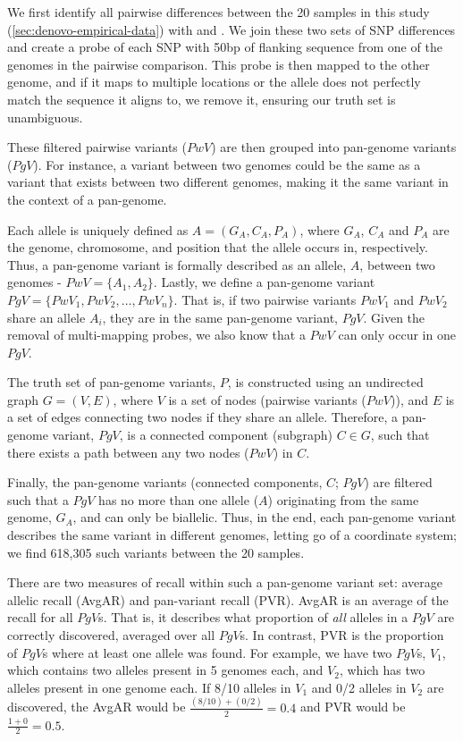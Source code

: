 We first identify all pairwise differences between the 20 samples in this study (\autoref{sec:denovo-empirical-data}) with  \cite{mummer2018} and  \cite{li2018}. We join these two sets of SNP differences and create a probe of each SNP with 50bp of flanking sequence from one of the genomes in the pairwise comparison. This probe is then mapped to the other genome, and if it maps to multiple locations or the allele does not perfectly match the sequence it aligns to, we remove it, ensuring our truth set is unambiguous.

These filtered pairwise variants ($PwV$) are then grouped into pan-genome variants ($PgV$). For instance, a variant between two genomes could be the same as a variant that exists between two different genomes, making it the same variant in the context of a pan-genome.

Each allele is uniquely defined as $A=(G_A,C_A,P_A)$, where $G_A$, $C_A$ and $P_A$ are the genome, chromosome, and position that the allele occurs in, respectively. Thus, a pan-genome variant is formally described as an allele, $A$, between two genomes - $PwV=\{A_1,A_2\}$. Lastly, we define a pan-genome variant $PgV=\{PwV_1,PwV_2,...,PwV_n\}$. That is, if two pairwise variants $PwV_1$ and $PwV_2$ share an allele $A_i$, they are in the same pan-genome variant, $PgV$. Given the removal of multi-mapping probes, we also know that a $PwV$ can only occur in one $PgV$.

The truth set of pan-genome variants, $P$, is constructed using an undirected graph $G=(V,E)$, where $V$ is a set of nodes (pairwise variants ($PwV$)), and $E$ is a set of edges connecting two nodes if they share an allele. Therefore, a pan-genome variant, $PgV$, is a connected component (subgraph) $C \in G$, such that there exists a path between any two nodes ($PwV$) in $C$.

Finally, the pan-genome variants (connected components, $C$; $PgV$) are filtered such that a $PgV$ has no more than one allele ($A$) originating from the same genome, $G_A$, and can only be biallelic. Thus, in the end, each pan-genome variant describes the same variant in different genomes, letting go of a coordinate system; we find 618,305 such variants between the 20 samples.

\noindent
There are two measures of recall within such a pan-genome variant set: average allelic recall (AvgAR) and pan-variant recall (PVR). AvgAR is an average of the recall for all $PgV$s. That is, it describes what proportion of \emph{all} alleles in a $PgV$ are correctly discovered, averaged over all $PgV$s. In contrast, PVR is the proportion of $PgV$s where at least one allele was found. For example, we have two $PgV$s,  $V_1$, which contains two alleles present in 5 genomes each, and $V_2$, which has two alleles present in one genome each. If 8/10 alleles in $V_1$ and 0/2 alleles in $V_2$ are discovered, the AvgAR would be $\frac{(8/10)+(0/2)}{2}=0.4$ and PVR would be $\frac{1+0}{2}=0.5$.